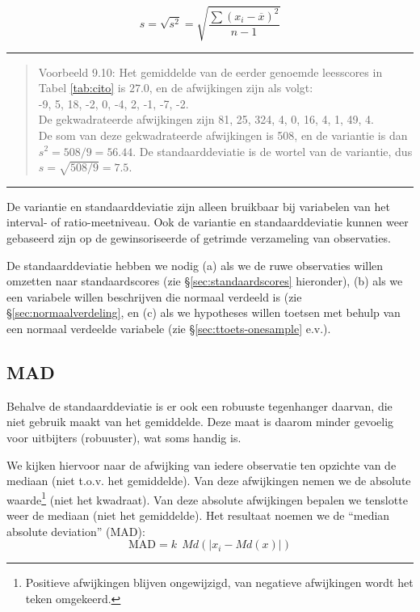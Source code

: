 \documentclass[
]{book}
\begin{document}
\begin{equation}
  s = \sqrt{s^2} = \sqrt{ \frac{ \sum (x_i - \overline{x})^2 } {n-1} }
  \label{eq:standaarddeviatie}
\end{equation}

\begin{center}\rule{0.5\linewidth}{0.5pt}\end{center}

\begin{quote}
Voorbeeld 9.10:
Het gemiddelde van de eerder genoemde leesscores in
Tabel \ref{tab:cito} is
\(27.0\), en de afwijkingen zijn als volgt:\\
-9, 5, 18, -2, 0, -4, 2, -1, -7, -2.\\
De gekwadrateerde afwijkingen zijn 81, 25, 324, 4, 0, 16, 4, 1, 49, 4.\\
De som van deze gekwadrateerde afwijkingen is 508, en de variantie is
dan \(s^2=508/9=56.44\). De standaarddeviatie is de wortel van de
variantie, dus \(s=\sqrt{508/9}=7.5\).
\end{quote}

\begin{center}\rule{0.5\linewidth}{0.5pt}\end{center}

De variantie en standaarddeviatie zijn alleen bruikbaar bij variabelen
van het interval- of ratio-meetniveau. Ook de variantie en
standaarddeviatie kunnen weer gebaseerd zijn op de gewinsoriseerde of
getrimde verzameling van observaties.

De standaarddeviatie hebben we nodig
(a) als we de ruwe observaties
willen omzetten naar standaardscores (zie §\ref{sec:standaardscores} hieronder),
(b) als we een variabele
willen beschrijven die normaal verdeeld is (zie §\ref{sec:normaalverdeling}, en
(c) als we hypotheses willen toetsen met behulp van een normaal verdeelde variabele (zie §\ref{sec:ttoets-onesample} e.v.).

\hypertarget{mad}{%
\subsection{MAD}\label{mad}}

Behalve de standaarddeviatie is er ook een robuuste tegenhanger daarvan,
die niet gebruik maakt van het gemiddelde. Deze maat is daarom minder
gevoelig voor uitbijters (robuuster), wat soms handig is.

We kijken hiervoor naar de afwijking van iedere observatie ten opzichte
van de mediaan (niet t.o.v. het gemiddelde). Van deze afwijkingen nemen
we de absolute waarde\footnote{Positieve afwijkingen blijven ongewijzigd, van negatieve afwijkingen wordt het teken omgekeerd.} (niet het kwadraat). Van deze absolute
afwijkingen bepalen we tenslotte weer de mediaan (niet het gemiddelde).
Het resultaat noemen we de ``median absolute deviation'' (MAD):
\begin{equation}
  \textrm{MAD} = k ~~ Md ( |x_i - Md(x) |)
  \label{eq:MAD}
\end{equation}
\end{document}
